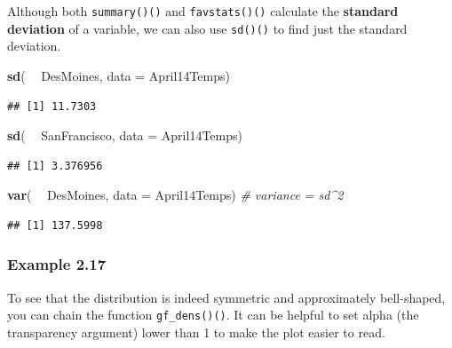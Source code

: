 \documentclass[]{book}
\newenvironment{Shaded}{\begin{snugshade}}{\end{snugshade}}
\newcommand{\CommentTok}[1]{\textcolor[rgb]{0.56,0.35,0.01}{\textit{#1}}}
\newcommand{\DataTypeTok}[1]{\textcolor[rgb]{0.13,0.29,0.53}{#1}}
\newcommand{\FloatTok}[1]{\textcolor[rgb]{0.00,0.00,0.81}{#1}}
\newcommand{\KeywordTok}[1]{\textcolor[rgb]{0.13,0.29,0.53}{\textbf{#1}}}
\newcommand{\NormalTok}[1]{#1}
\newcommand{\OperatorTok}[1]{\textcolor[rgb]{0.81,0.36,0.00}{\textbf{#1}}}
\newcommand{\StringTok}[1]{\textcolor[rgb]{0.31,0.60,0.02}{#1}}
\begin{document}
Although both \texttt{summary()()} and \texttt{favstats()()} calculate the \textbf{standard deviation} of a variable, we can also use \texttt{sd()()} to find just the standard deviation.

\begin{Shaded}
\begin{Highlighting}[]
\KeywordTok{sd}\NormalTok{( }\OperatorTok{~}\StringTok{ }\NormalTok{DesMoines, }\DataTypeTok{data =}\NormalTok{ April14Temps)        }
\end{Highlighting}
\end{Shaded}

\begin{verbatim}
## [1] 11.7303
\end{verbatim}

\begin{Shaded}
\begin{Highlighting}[]
\KeywordTok{sd}\NormalTok{( }\OperatorTok{~}\StringTok{ }\NormalTok{SanFrancisco, }\DataTypeTok{data =}\NormalTok{ April14Temps)}
\end{Highlighting}
\end{Shaded}

\begin{verbatim}
## [1] 3.376956
\end{verbatim}

\begin{Shaded}
\begin{Highlighting}[]
\KeywordTok{var}\NormalTok{( }\OperatorTok{~}\StringTok{ }\NormalTok{DesMoines, }\DataTypeTok{data =}\NormalTok{ April14Temps)        }\CommentTok{# variance = sd^2}
\end{Highlighting}
\end{Shaded}

\begin{verbatim}
## [1] 137.5998
\end{verbatim}

\hypertarget{example-2.17}{%
\subsubsection{Example 2.17}\label{example-2.17}}

To see that the distribution is indeed symmetric and approximately bell-shaped, you can chain the function \texttt{gf\_dens()()}. It can be helpful to set alpha (the transparency argument) lower than 1 to make the plot easier to read.

\begin{Shaded}
\end{Shaded}
\end{document}
